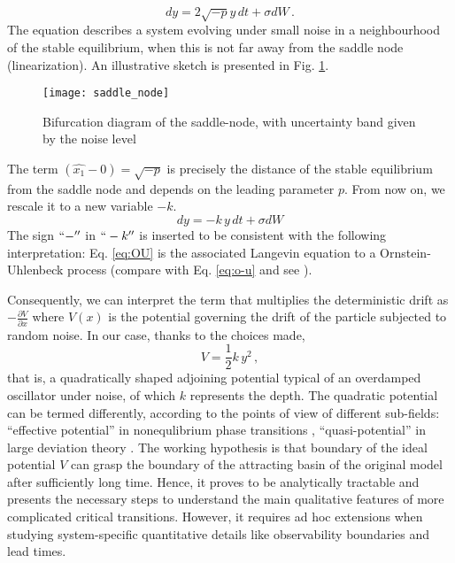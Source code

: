 \begin{equation}
	dy = 2\sqrt{-p} y \, dt + \sigma dW \, .
	\label{eq:langevin}
\end{equation}
The equation describes a system evolving under small noise in a neighbourhood of the stable equilibrium, when this is not far away from the saddle node (linearization). An illustrative sketch is presented in Fig. \ref{fig:sketch_fold_noise}. 

\begin{figure}[h!]
	\centering
	\texttt{[image: saddle\_node]}
	\caption{\small Bifurcation diagram of the saddle-node, with uncertainty band given by the noise level}
	\label{fig:sketch_fold_noise}
\end{figure}

The term $(\hat{x_1} - 0) = \sqrt{-p}$ is precisely the distance of the stable equilibrium from the saddle node and depends on the leading parameter $p$. From now on, we rescale it to a new variable $-k$. 
\begin{equation}
	dy = -k \, y \, dt + \sigma dW
	\label{eq:OU}
\end{equation}
The sign $``-''$ in $``-k''$ is inserted to be consistent with the following interpretation: Eq. \ref{eq:OU} is the associated Langevin equation to a Ornstein-Uhlenbeck process (compare with Eq. \ref{eq:o-u} and see \textcite{papoulis2002probability, Gardiner1985}). 

Consequently, we can interpret the term that multiplies the deterministic drift as $-\frac{\partial V}{\partial x}$ where $V(x)$ is the potential governing the drift of the particle subjected to random noise. In our case, thanks to the choices made, 
\begin{equation} \label{eq:potential_fold}
	V = \frac{1}{2} k \, y^2 \, ,
\end{equation}
that is, a quadratically shaped adjoining potential typical of an overdamped oscillator under noise, of which $k$ represents the depth. The quadratic potential can be termed differently, according to the points of view of different sub-fields: ``effective potential'' in nonequlibrium phase transitions \citep{zaikin2001additive}, ``quasi-potential'' in large deviation theory \citep{freidlin1998random,Nolting2016,Zhou2012}. The working hypothesis is that boundary of the ideal potential $V$ can grasp the boundary of the attracting basin of the original model after sufficiently long time. Hence, it proves to be analytically tractable and presents the necessary steps to understand the main qualitative features of more complicated critical transitions. However, it requires ad hoc extensions when studying system-specific quantitative details like observability boundaries and lead times.

